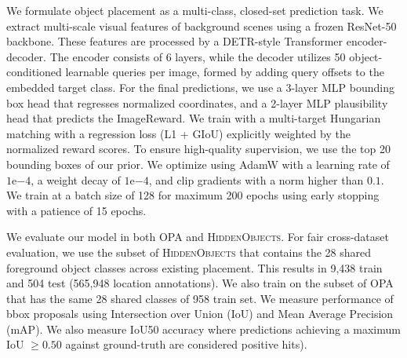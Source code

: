 
 We formulate object placement as a multi-class, closed-set prediction task. We extract multi-scale visual features of background scenes using a frozen ResNet-50 backbone. These features are processed by a DETR-style Transformer encoder-decoder. The encoder consists of 6 layers, while the decoder utilizes 50 object-conditioned learnable queries per image, formed by adding query offsets to the embedded target class. For the final predictions, we use a 3-layer MLP bounding box head that regresses normalized coordinates, and a 2-layer MLP plausibility head that predicts the ImageReward. We train with a multi-target Hungarian matching with a regression loss (L1 + GIoU) explicitly weighted by the normalized reward scores. To ensure high-quality supervision, we use the top 20 bounding boxes of our prior. We optimize using AdamW with a learning rate of $1\mathrm{e}{-4}$, a weight decay of $1\mathrm{e}{-4}$, and clip gradients with a norm higher than $0.1$. We train at a batch size of 128 for maximum 200 epochs using early stopping with a patience of 15 epochs. 

 We evaluate our model in both OPA and \textsc{HiddenObjects}. For fair cross-dataset evaluation, we use the subset of \textsc{HiddenObjects} that contains the 28 shared foreground object classes across existing placement. This results in 9,438 train and 504 test (565,948  location annotations). We also train on the subset of OPA that has the same 28 shared classes of 958 train set. We measure performance of bbox proposals using Intersection over Union (IoU) and Mean Average Precision (mAP). We also measure IoU50 accuracy where predictions achieving a maximum IoU $\geq 0.50$ against ground-truth are considered positive hits).

